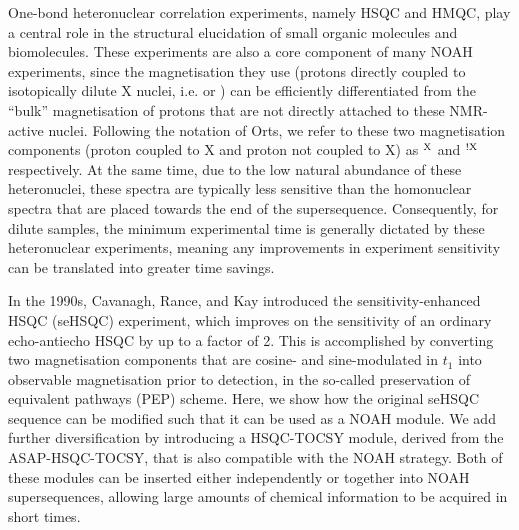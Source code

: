 \documentclass[11pt]{article}
\newcommand*{\carbon}{\ce{^{13}C}}
\newcommand*{\nitrogen}{\ce{^{15}N}}
\newcommand*{\magn}[1]{\ce{^1H}$^{#1}$}
\newcommand*{\magnnot}[1]{\ce{^1H}$^{!#1}$}
\begin{document}
One-bond heteronuclear correlation experiments, namely HSQC and HMQC, play a central role in the structural elucidation of small organic molecules and biomolecules.\autocite{textbooks}
These experiments are also a core component of many NOAH experiments, since the magnetisation they use (protons directly coupled to isotopically dilute X nuclei, i.e. \carbon{} or \nitrogen{}) can be efficiently differentiated from the ``bulk'' magnetisation of protons that are not directly attached to these NMR-active nuclei.\autocite{Garbow1982CPL, Kupce2019JMR}
Following the notation of Orts,\autocite{Orts2018M} we refer to these two magnetisation components (proton coupled to X and proton not coupled to X) as \magn{\ce{X}} and \magnnot{\ce{X}} respectively.
At the same time, due to the low natural abundance of these heteronuclei, these spectra are typically less sensitive than the homonuclear spectra that are placed towards the end of the supersequence.
Consequently, for dilute samples, the minimum experimental time is generally dictated by these heteronuclear experiments, meaning any improvements in experiment sensitivity can be translated into greater time savings.

In the 1990s, Cavanagh, Rance, and Kay introduced the sensitivity-enhanced HSQC (seHSQC) experiment, which improves on the sensitivity of an ordinary echo-antiecho HSQC by up to a factor of 2.\autocite{sehsqc}
This is accomplished by converting two magnetisation components that are cosine- and sine-modulated in $t_1$ into observable magnetisation prior to detection, in the so-called preservation of equivalent pathways (PEP) scheme.
Here, we show how the original seHSQC sequence can be modified such that it can be used as a NOAH module.
We add further diversification by introducing a HSQC-TOCSY module, derived from the ASAP-HSQC-TOCSY,\autocite{Becker2019JMR} that is also compatible with the NOAH strategy.
Both of these modules can be inserted either independently or together into NOAH supersequences, allowing large amounts of chemical information to be acquired in short times.


\end{document}
